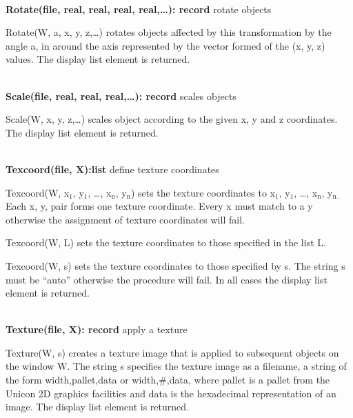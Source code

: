 \documentclass[letterpaper]{article}
\newcommand\textsubscript[1]{\ensuremath{{}_{\text{#1}}}}
\begin{document}
\noindent\hrulefill\\
\noindent\textsf{\textbf{Rotate(file, real, real, real, real,{\dots}): record}}
\hfill rotate objects


\bigskip

{
\textsf{Rotate(W, a, x, y, z,{\dots})} rotates objects affected by this transformation by the angle a, in around the
axis represented by the vector formed of the (x, y, z) values. The display list element is returned.}

\noindent\hrulefill\\
\noindent\textsf{\textbf{Scale(file, real, real, real,{\dots}): record}} \hfill
scales objects


\bigskip

{
\textsf{Scale(W, x, y, z,{\dots})} scales object according to the given x, y and z coordinates. The display list element
is returned.}

\noindent\hrulefill\\
\noindent\textsf{\textbf{Texcoord(file, X):list}}
\hfill define texture coordinates


\bigskip

{
\textsf{Texcoord(W, x}\textsf{\textsubscript{1}}\textsf{, y}\textsf{\textsubscript{1}}\textsf{, {\dots},
x}\textsf{\textsubscript{n}}\textsf{, y}\textsf{\textsubscript{n}}\textsf{) }sets the texture coordinates to
\textsf{x}\textsf{\textsubscript{1}}\textsf{, y}\textsf{\textsubscript{1}}\textsf{, {\dots},
x}\textsf{\textsubscript{n}}\textsf{, y}\textsf{\textsubscript{n}}\texttt{\textsubscript{. }}Each x, y, pair forms one
texture coordinate. Every x must match to a y otherwise the assignment of texture coordinates will fail. }

{
\textsf{Texcoord(W, L)} sets the texture coordinates to those specified in the list \textsf{L}. }

\textsf{Texcoord(W, s) }sets the texture coordinates to those
specified by \textsf{s}. The string \textsf{s} must be
\textsf{{}``auto''} otherwise the procedure will fail. In all cases
the display list element is returned.

\noindent\hrulefill\\
\noindent\textsf{\textbf{Texture(file, X): record}} \hfill apply a texture


\bigskip

{
\textsf{Texture(W, s) }creates a texture image that is applied to subsequent objects on the window \textsf{W}. The
string \textsf{s} specifies the texture image as a filename, a string of the form \textsf{width,pallet,data} or
\textsf{width,\#,data}, where pallet is a pallet from the Unicon 2D graphics facilities and data is the hexadecimal
representation of an image. The display list element is returned.}
\end{document}
